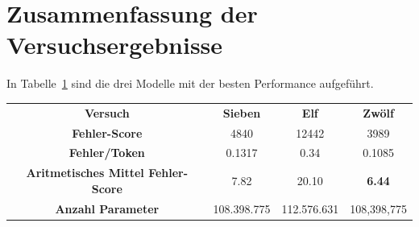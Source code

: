 \documentclass[pdftex,a4paper,halfparskip, article]{scrartcl}
\begin{document}
%
%
%
%

\section{Zusammenfassung der Versuchsergebnisse}

In Tabelle~\ref{tab:comparison} sind die drei Modelle mit der besten Performance aufgeführt.

\begin{table}[]
\begin{tabular}{cccc}
\textbf{Versuch}                           & \textbf{Sieben} & \textbf{Elf} & \textbf{Zwölf} \\
\textbf{Fehler-Score}                      & 4840            & 12442        & 3989           \\
\textbf{Fehler/Token}                      & 0.1317          & 0.34         & 0.1085         \\
\textbf{Aritmetisches Mittel Fehler-Score} & 7.82            & 20.10        & \textbf{6.44}           \\
\textbf{Anzahl Parameter}                  & 108.398.775     & 112.576.631  & 108,398,775   
\end{tabular}
\label{tab:comparison}
\end{table}
\end{document}
